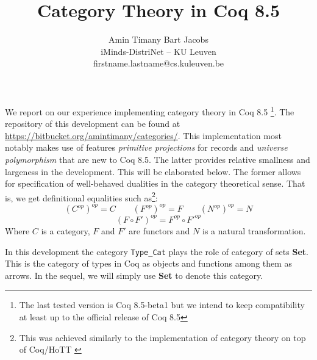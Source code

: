 \documentclass[9pt, twocolumn]{extarticle}
\begin{document}
\title{Category Theory in Coq 8.5}
\author{Amin Timany \hspace{2em} Bart Jacobs \\[1em]
iMinds-DistriNet -- KU Leuven \\[0.2em]
firstname.lastname@cs.kuleuven.be}
\date{}

\maketitle

We report on our experience implementing category theory in Coq 8.5
\footnote{The last tested version is Coq 8.5-beta1 but we intend to keep compatibility at least up to the official release of Coq 8.5}.
The repository of this development can be found at \url{https://bitbucket.org/amintimany/categories/}.
This implementation most notably makes use of features \emph{primitive projections} for records and \emph{universe polymorphism} that are new to Coq 8.5.
The latter provides relative smallness and largeness in the development.
This will be elaborated below.
The former allows for specification of well-behaved dualities in the category theoretical sense.
That is, we get definitional equalities such as\footnote{This was achieved similarly to the implementation of category theory on top of Coq/HoTT \cite{DBLP:conf/itp/GrossCS14}}:
\[
(C^{op})^{op} = C \hspace{2em} (F^{op})^{op} = F \hspace{2em} (N^{op})^{op} = N
\]
\[
(F \circ F')^{op} = F^{op} \circ F'^{op}
\]
Where $C$ is a category, $F$ and $F'$ are functors and $N$ is a natural transformation.

In this development the category \texttt{Type\_Cat} plays the role of category of sets \textbf{Set}. This is the category of types in Coq as objects and functions among them as arrows. In the sequel, we will simply use \textbf{Set} to denote this category.
\end{document}
